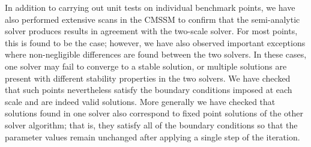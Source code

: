 \documentclass[final,3p,11pt,pdflatex]{elsarticle}
\begin{document}
In addition to carrying out unit tests on individual benchmark points, we have
also performed extensive scans in the CMSSM to confirm that the semi-analytic
solver produces results in agreement with the two-scale solver.  For most
points, this is found to be the case; however, we have also observed important
exceptions where non-negligible differences are found between the two
solvers.  In these cases, one solver may fail to converge to a stable
solution, or multiple solutions are present \cite{Allanach:2013cda} with
different stability properties in the two solvers.  We have checked that such
points nevertheless satisfy the boundary conditions imposed at each
scale and are indeed valid solutions.  More generally we have checked that
solutions found in one solver also correspond to fixed point solutions of the
other solver algorithm; that is, they satisfy all of the boundary conditions
so that the parameter values remain unchanged after applying a single step of
the iteration.
\end{document}
